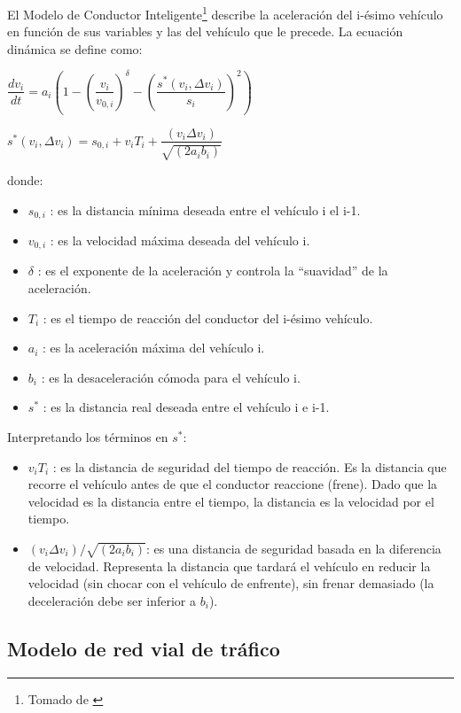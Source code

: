 \documentclass[colorinlistoftodos,twoside,twocolumn]{article} %
\begin{document}
	El Modelo de Conductor Inteligente\footnote{Tomado de \cite{A1}} describe la aceleración del i-ésimo vehículo en función de sus variables y las del vehículo que le precede. La ecuación dinámica se define como:
	
	\begin{center}
		$  \dfrac{dv_{i}}{dt} = a_{i} \left(1 - \left(\dfrac{v_{i}}{v_{0,i}}\right)^{\delta} - \left(\dfrac{s^{*}(v_{i}, \Delta v_{i})}{s_{i}}\right)^{2}\right)$
		
		\vspace{0.5em}
		$ s^{*}(v_{i}, \Delta v_{i}) =  s_{0,i} + v_{i}T_{i} + \dfrac{(v_{i} \Delta v_{i})}{\sqrt{(2a_{i} b_{i})}}$
	\end{center}
	donde:
	\begin{itemize}
		\item $ s_{0,i} $ : es la distancia mínima deseada entre el vehículo i el i-1.
		\item $ v_{0,i} $ : es la velocidad máxima deseada del vehículo i.
		\item $\delta$ : es el exponente de la aceleración y controla la “suavidad” de la aceleración.
		\item $ T_{i} $  : es el tiempo de reacción del conductor del i-ésimo vehículo.
		\item $ a_{i} $ : es la aceleración máxima del vehículo i.
		\item $ b_{i} $ : es la desaceleración cómoda para el vehículo i.
		\item $ s^{*} $ : es la distancia real deseada entre el vehículo i e i-1.
	\end{itemize}
	
	Interpretando los t\'erminos en $ s^{*} $:
	\begin{itemize}
		\item $ v_{i}T_{i}  $ : es la distancia de seguridad del tiempo de reacción. Es la distancia que recorre el vehículo antes de que el conductor reaccione (frene).
		Dado que la velocidad es la distancia entre el tiempo, la distancia es la velocidad por el tiempo.
		\item $ (v_{i} \Delta v_{i})/\sqrt{(2a_{i} b_{i})} $: es una distancia de seguridad basada en la diferencia de velocidad. Representa la distancia que tardará el vehículo en reducir la velocidad (sin chocar con el vehículo de enfrente), sin frenar demasiado (la deceleración debe ser inferior a $ b_{i} $).
	\end{itemize}
	
	\subsection{Modelo de red vial de tráfico}
	
\end{document}
